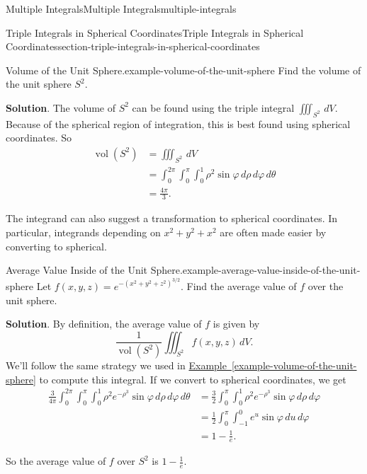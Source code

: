 \documentclass[oneside,10pt,]{book}
\numberwithin{equation}{section}
\newcommand{\amp}{&}
\begin{document}
\begin{chapterptx}{Multiple Integrals}{}{Multiple Integrals}{}{}{multiple-integrals}
\begin{sectionptx}{Triple Integrals in Spherical Coordinates}{}{Triple Integrals in Spherical Coordinates}{}{}{section-triple-integrals-in-spherical-coordinates}
\begin{example}{Volume of the Unit Sphere.}{example-volume-of-the-unit-sphere}
\hypertarget{p-1537}{}%
Find the volume of the unit sphere \(S^{2}\).%
\par\smallskip%
\noindent\textbf{Solution}.\hypertarget{solution-255}{}\quad%
\hypertarget{p-1538}{}%
The volume of \(S^{2}\) can be found using the triple integral \(\iiint_{S^{2}}\,dV\). Because of the spherical region of integration, this is best found using spherical coordinates. So%
\begin{align*}
\operatorname{vol}(S^{2}) \amp = \iiint_{S^{2}}\,dV \\
\amp = \int_{0}^{2\pi}\int_{0}^{\pi}\int_{0}^{1}\rho^{2}\sin\varphi\,d\rho\,d\varphi\,d\theta \\
\amp = \frac{4\pi}{3} \text{.}
\end{align*}
%
\end{example}
\hypertarget{p-1539}{}%
The integrand can also suggest a transformation to spherical coordinates. In particular, integrands depending on \(x^{2} + y^{2} + x^{2}\) are often made easier by converting to spherical.%
\begin{example}{Average Value Inside of the Unit Sphere.}{example-average-value-inside-of-the-unit-sphere}%
\hypertarget{p-1540}{}%
Let \(f(x,y,z) = e^{-(x^{2} + y^{2} + z^{2})^{3/2}}\). Find the average value of \(f\) over the unit sphere.%
\par\smallskip%
\noindent\textbf{Solution}.\hypertarget{solution-256}{}\quad%
\hypertarget{p-1541}{}%
By definition, the average value of \(f\) is given by%
\begin{equation*}
\frac{1}{\operatorname{vol}(S^{2})}\iiint_{S^{2}}f(x,y,z)\,dV\text{.}
\end{equation*}
We'll follow the same strategy we used in \hyperref[example-volume-of-the-unit-sphere]{Example~\ref{example-volume-of-the-unit-sphere}} to compute this integral. If we convert to spherical coordinates, we get%
\begin{align*}
\frac{3}{4\pi}\int_{0}^{2\pi}\int_{0}^{\pi}\int_{0}^{1}\rho^{2}e^{-\rho^{3}}\sin\varphi \,d\rho\,d\varphi\,d\theta \amp = \frac{3}{2}\int_{0}^{\pi}\int_{0}^{1}\rho^{2}e^{-\rho^{3}}\sin\varphi \,d\rho\,d\varphi \\
\amp = \frac{1}{2}\int_{0}^{\pi}\int_{-1}^{0}e^{u}\sin\varphi \,du\,d\varphi \\
\amp = 1 - \frac{1}{e} \text{.}
\end{align*}
%
\par
\hypertarget{p-1542}{}%
So the average value of \(f\) over \(S^{2}\) is \(1 - \frac{1}{e}\).%
\end{example}

\end{sectionptx}
\end{chapterptx}
\end{document}
